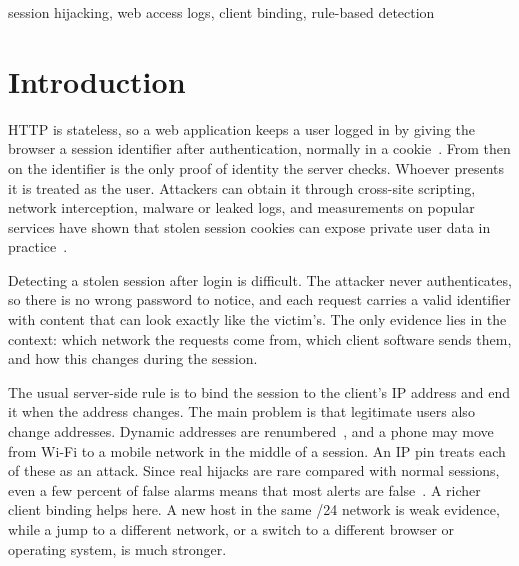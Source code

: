 \documentclass[conference]{IEEEtran}
\begin{document}
\begin{IEEEkeywords}
session hijacking, web access logs, client binding, rule-based detection
\end{IEEEkeywords}

\section{Introduction}

HTTP is stateless, so a web application keeps a user logged in by giving the
browser a session identifier after authentication, normally in a
cookie~\cite{rfc6265}. From then on the identifier is the only proof of identity
the server checks. Whoever presents it is treated as the user. Attackers can
obtain it through cross-site scripting, network interception, malware or leaked
logs, and measurements on popular services have shown that stolen session
cookies can expose private user data in
practice~\cite{sivakorn2016cookie,calzavara2017surviving}.

Detecting a stolen session after login is difficult. The attacker never
authenticates, so there is no wrong password to notice, and each request carries
a valid identifier with content that can look exactly like the victim's. The
only evidence lies in the context: which network the requests come from, which
client software sends them, and how this changes during the session.

The usual server-side rule is to bind the session to the client's IP address and
end it when the address changes. The main problem is that legitimate users also
change addresses. Dynamic addresses are renumbered~\cite{padmanabhan2016dynamic},
and a phone may move from Wi-Fi to a mobile network in the middle of a session.
An IP pin treats each of these as an attack. Since real hijacks are rare
compared with normal sessions, even a few percent of false alarms means that
most alerts are false~\cite{axelsson2000baserate}. A richer client binding helps
here. A new host in the same /24 network is weak evidence, while a jump to a
different network, or a switch to a different browser or operating system, is
much stronger.
\end{document}
